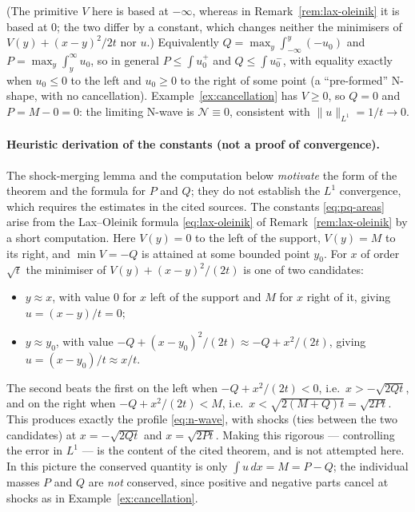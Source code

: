 
\noindent (The primitive $V$ here is based at $-\infty$, whereas in
Remark~\ref{rem:lax-oleinik} it is based at $0$; the two differ by a constant,
which changes neither the minimisers of $V(y)+(x-y)^2/2t$ nor $u$.)
Equivalently $Q=\max_y\int_{-\infty}^y(-u_0)$ and
$P=\max_y\int_y^\infty u_0$, so in general
$P\le\int u_0^+$ and $Q\le\int u_0^-$, with equality exactly when $u_0\le0$
to the left and $u_0\ge0$ to the right of some point (a ``pre-formed''
N-shape, with no cancellation). Example~\ref{ex:cancellation} has $V\ge0$,
so $Q=0$ and $P=M-0=0$: the limiting N-wave is $\mathcal{N}\equiv0$, consistent with
$\|u\|_{L^1}=1/t\to0$.

\paragraph{Heuristic derivation of the constants (not a proof of
convergence).} The shock-merging lemma and the computation below
\emph{motivate} the form of the theorem and the formula for $P$ and $Q$;
they do not establish the $L^1$ convergence, which requires the estimates
in the cited sources. The constants \eqref{eq:pq-areas} arise from the
Lax--Oleinik formula \eqref{eq:lax-oleinik} of
Remark~\ref{rem:lax-oleinik} by a short computation. Here $V(y)=0$ to the
left of the support, $V(y)=M$ to its right, and $\min V=-Q$ is attained at
some bounded point $y_0$. For $x$ of order $\sqrt t$ the minimiser of
$V(y)+(x-y)^2/(2t)$ is one of two candidates:
\begin{itemize}
  \item $y\approx x$, with value $0$ for $x$ left of the support and $M$
    for $x$ right of it, giving $u=(x-y)/t=0$;
  \item $y\approx y_0$, with value $-Q+(x-y_0)^2/(2t)\approx -Q+x^2/(2t)$,
    giving $u=(x-y_0)/t\approx x/t$.
\end{itemize}
The second beats the first on the left when $-Q+x^2/(2t)<0$, i.e.\
$x>-\sqrt{2Qt}$, and on the right when $-Q+x^2/(2t)<M$, i.e.\
$x<\sqrt{2(M+Q)t}=\sqrt{2Pt}$. This produces exactly the profile
\eqref{eq:n-wave}, with shocks (ties between the two candidates) at
$x=-\sqrt{2Qt}$ and $x=\sqrt{2Pt}$. Making this rigorous --- controlling
the error in $L^1$ --- is the content of the cited theorem, and is not
attempted here. In this
picture the conserved quantity is only $\int u\,dx=M=P-Q$; the
individual masses $P$ and $Q$ are \emph{not} conserved, since positive and
negative parts cancel at shocks as in Example~\ref{ex:cancellation}.

